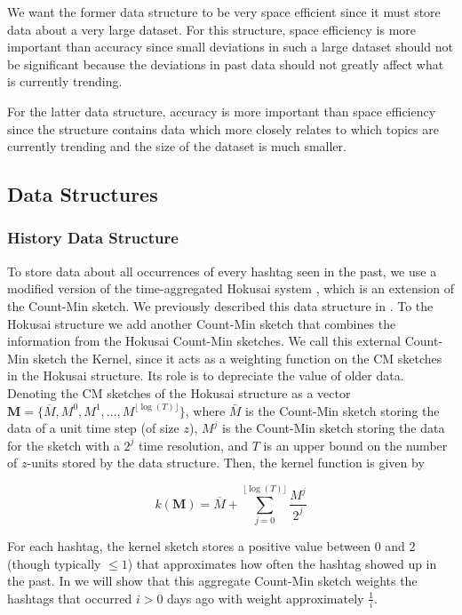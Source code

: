 \documentclass[twoside]{article}
\newcommand{\nref}[1]
 {\textbf{\nameref{#1}}}
\newcommand{\cc}[1]
 {\textbf{\cite{#1}}}
\begin{document}
We want the former data structure to be very space efficient since it must store data about a very large dataset.  For this structure, space efficiency is more important than accuracy since small deviations in such a large dataset should not be significant because the deviations in past data should not greatly affect what is currently trending.

For the latter data structure, accuracy is more important than space efficiency since the structure contains data which more closely relates to which topics are currently trending and the size of the dataset is much smaller.


\subsection{Data Structures}
\subsubsection{History Data Structure}

To store data about all occurrences of every hashtag seen in the past, we use a modified version of the time-aggregated Hokusai system \cc{Matusevych:2012}, which is an extension of the Count-Min sketch. We previously described this data structure in \nref{sec:PreviousWork}. 
To the Hokusai structure we add another Count-Min sketch that combines the information from the Hokusai Count-Min sketches. We call this external Count-Min sketch the Kernel, since it acts as a weighting function on the CM sketches in the Hokusai structure. Its role is to depreciate the value of older data.
Denoting the CM sketches of the Hokusai structure as a vector $\textbf{M} = \{\overline{M}, M^0, M^1, ..., M^{{\lfloor {\log(T)} \rfloor}}\}$, where $\bar{M}$ is the Count-Min sketch storing the data of a unit time step (of size $z$), $M^j$ is the Count-Min sketch storing the data for the sketch with a $2^j$ time resolution, and $T$ is an upper bound on the number of $z$-units stored by the data structure. Then, the kernel function is given by

\begin{equation} 
\label{eq:kernel}
\textit{k}(\textbf{M}) = \overline{M} + \sum\limits_{j=0}^{{\lfloor \log⁡(T) \rfloor}} \frac{M^j}{2^j}
\end{equation}

For each hashtag, the kernel sketch stores a positive value between $0$ and $2$ (though typically $\leq 1$) that approximates how often the hashtag showed up in the past. In \nref{sec:Correctness} we will show that this aggregate Count-Min sketch weights the hashtags that occurred $i > 0$ days ago with weight approximately $\frac{1}{i}$.
\end{document}
